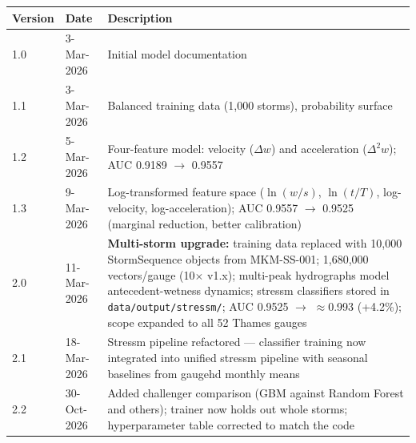\documentclass[11pt,a4paper]{article}
\begin{document}
\begin{center}
\begin{tabular}{llp{7.5cm}}
\toprule
\textbf{Version} & \textbf{Date} & \textbf{Description} \\
\midrule
1.0 & 3-Mar-2026 & Initial model documentation \\
1.1 & 3-Mar-2026 & Balanced training data (1{,}000 storms), probability surface \\
1.2 & 5-Mar-2026 & Four-feature model: velocity ($\Delta w$) and acceleration
    ($\Delta^2 w$); AUC 0.9189 $\to$ 0.9557 \\
1.3 & 9-Mar-2026 & Log-transformed feature space ($\ln(w/s)$, $\ln(t/T)$,
    log-velocity, log-acceleration); AUC 0.9557 $\to$ 0.9525
    (marginal reduction, better calibration) \\
2.0 & 11-Mar-2026 & \textbf{Multi-storm upgrade:} training data replaced with
    10{,}000 StormSequence objects from MKM-SS-001; 1{,}680{,}000 vectors/gauge
    (10$\times$ v1.x); multi-peak hydrographs model antecedent-wetness dynamics;
    stressm classifiers stored in \texttt{data/output/stressm/};
    AUC 0.9525 $\to$ $\approx$0.993 (+4.2\%); scope expanded to all 52 Thames gauges \\
2.1 & 18-Mar-2026 & Stressm pipeline refactored --- classifier training now
    integrated into unified stressm pipeline with seasonal baselines from
    gaugehd monthly means \\
2.2 & 30-Oct-2026 & Added challenger comparison (GBM against Random Forest and
    others); trainer now holds out whole storms; hyperparameter table corrected
    to match the code \\
\bottomrule
\end{tabular}
\end{center}
\end{document}
